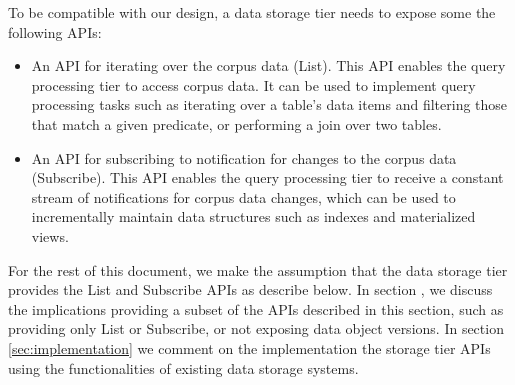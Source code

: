 
To be compatible with our design, a data storage tier needs to expose some the following APIs:
\begin{itemize}
  \item An API for iterating over the corpus data (List).
  This API enables the query processing tier to access corpus data.
  It can be used to implement query processing tasks such as iterating over a table's data items and filtering those that
  match a given predicate, or performing a join over two tables.

  \item An API for subscribing to notification for changes to the corpus data (Subscribe).
  This API enables the query processing tier to receive a constant stream of notifications for corpus data changes,
  which can be used to incrementally maintain data structures such as indexes and materialized views.
\end{itemize}



For the rest of this document,
we make the assumption that the data storage tier provides the List and Subscribe APIs as describe below.
In section , we discuss the implications providing a subset of the APIs described in this section,
such as providing only List or Subscribe, or not exposing data object versions.
In section \ref{sec:implementation} we comment on the implementation the storage tier APIs using the functionalities of existing data storage systems.

